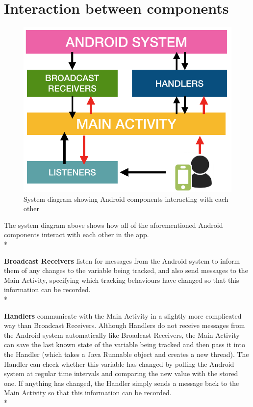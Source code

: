 \documentclass[12pt,twoside]{report}
\begin{document}
\newpage
\section{Interaction between components}
\begin{figure}[H]
    \centering
    \includegraphics{figures/System_Diagram.png}
    \caption{System diagram showing Android components interacting with each other}
    \label{fig:my_label}
\end{figure}

The system diagram above shows how all of the aforementioned Android components interact with each other in the app.\\*

\textbf{Broadcast Receivers} listen for messages from the Android system to inform them of any changes to the variable being tracked, and also send messages to the Main Activity, specifying which tracking behaviours have changed so that this information can be recorded.\\*

\textbf{Handlers} communicate with the Main Activity in a slightly more complicated way than Broadcast Receivers. Although Handlers do not receive messages from the Android system automatically like Broadcast Receivers, the Main Activity can save the last known state of the variable being tracked and then pass it into the Handler (which takes a Java Runnable object and creates a new thread). The Handler can check whether this variable has changed by polling the Android system at regular time intervals and comparing the new value with the stored one. If anything has changed, the Handler simply sends a message back to the Main Activity so that this information can be recorded. \\*
\end{document}
